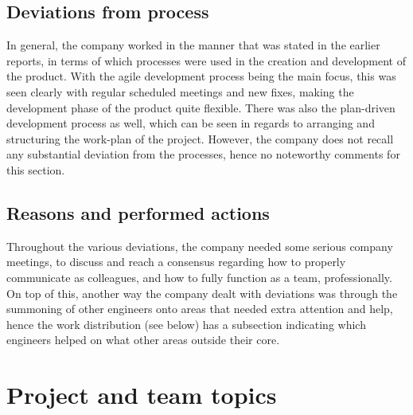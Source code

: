 \documentclass{article}
\begin{document}
\begin{comment}
 - Sickness
 - Lack of attendance at company meetings
 - Delayed functionalities 
 - External clients (other courses)
\end{comment}
\newpage
\subsection*{Deviations from process}
In general, the company worked in the manner that was stated in the earlier reports, in terms of which processes were used in the creation and development of the product. With the agile development process being the main focus, this was seen clearly with regular scheduled meetings and new fixes, making the development phase of the product quite flexible. There was also the plan-driven development process as well, which can be seen in regards to arranging and structuring the work-plan of the project. 
\newline
However, the company does not recall any substantial deviation from the processes, hence no noteworthy comments for this section.
\subsection*{Reasons and performed actions}

Throughout the various deviations, the company needed some serious company meetings, to discuss and reach a consensus regarding how to properly communicate as colleagues, and how to fully function as a team, professionally. 
\newline
On top of this, another way the company dealt with deviations was through the summoning of other engineers onto areas that needed extra attention and help, hence the work distribution (see below) has a subsection indicating which engineers helped on what other areas outside their core.
\newpage

\section*{Project and team topics}
\end{document}
